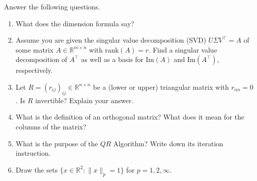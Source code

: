 Answer the following questions.
\begin{enumerate}
	\item What does the dimension formula say?
	
	\item Assume you are given the singular value decomposition (SVD) $U \Sigma V^\top = A$ of some matrix $A \in \mathbb{R}^{m \times n}$ with $\text{rank}(A)=r$. {\tiny }Find a singular value decomposition of $A^\top$ as well as a basis for $\text{Im}(A)$ and $\text{Im}(A^\top)$, respectively.
	
	\item Let $R=(r_{ij})_{ij} \in \mathbb{R}^{n \times n}$ be a (lower or upper) triangular matrix with $r_{nn} = 0$. Is $R$ invertible? Explain your answer.
	\item What is the definition of an orthogonal matrix? What does it mean for the columns of the matrix?
	\item What is the purpose of the $QR$ Algorithm? Write down its iteration instruction.
	
	
	\item Draw the sets $\{x \in \mathbb{R}^{2} \colon \|x\|_p = 1   \}$ for $p=1,2,\infty$.
\end{enumerate}
